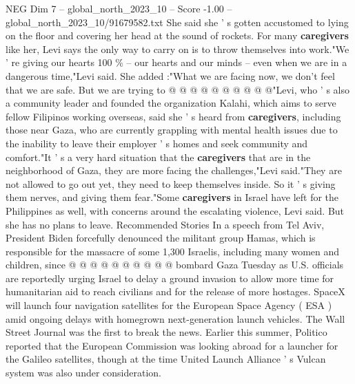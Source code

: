 \begin{textsample}{NEG Dim 7 – global\_north\_2023\_10 – Score -1.00 – global\_north\_2023\_10/91679582.txt}
She said she ' s gotten accustomed to lying on the floor and covering her head at the sound of rockets.
For many \textbf{caregivers} like her, Levi says the only way to carry on is to throw themselves into work."We ' re giving our hearts 100 \% -- our hearts and our minds -- even when we are in a dangerous time,"Levi said.
She added :"What we are facing now, we don't feel that we are safe.
But we are trying to @ @ @ @ @ @ @ @ @ @"Levi, who ' s also a community leader and founded the organization Kalahi, which aims to serve fellow Filipinos working overseas, said she ' s heard from \textbf{caregivers}, including those near Gaza, who are currently grappling with mental health issues due to the inability to leave their employer ' s homes and seek community and comfort."It ' s a very hard situation that the \textbf{caregivers} that are in the neighborhood of Gaza, they are more facing the challenges,"Levi said."They are not allowed to go out yet, they need to keep themselves inside.
So it ' s giving them nerves, and giving them fear."Some \textbf{caregivers} in Israel have left for the Philippines as well, with concerns around the escalating violence, Levi said.
But she has no plans to leave.
Recommended Stories In a speech from Tel Aviv, President Biden forcefully denounced the militant group Hamas, which is responsible for the massacre of some 1,300 Israelis, including many women and children, since @ @ @ @ @ @ @ @ @ @ bombard Gaza Tuesday as U.S. officials are reportedly urging Israel to delay a ground invasion to allow more time for humanitarian aid to reach civilians and for the release of more hostages.
SpaceX will launch four navigation satellites for the European Space Agency ( ESA ) amid ongoing delays with homegrown next-generation launch vehicles.
The Wall Street Journal was the first to break the news.
Earlier this summer, Politico reported that the European Commission was looking abroad for a launcher for the Galileo satellites, though at the time United Launch Alliance ' s Vulcan system was also under consideration.

\end{textsample}
